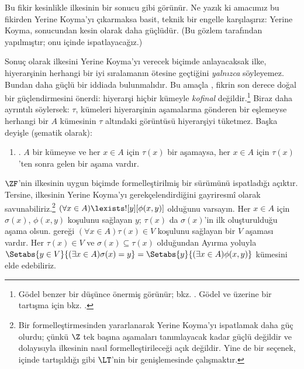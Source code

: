 Bu fikir kesinlikle \stagesinex{} ilkesinin bir sonucu gibi görünür. Ne yazık
ki amacımız bu fikirden Yerine Koyma'yı çıkarmaksa basit, teknik bir engelle
karşılaşırız: Yerine Koyma,
 sonucundan kesin olarak
daha güçlüdür. (Bu gözlem \citet[\S13.2]{Potter2004} tarafından yapılmıştır;
onu  içinde
ispatlayacağız.)

Sonuç olarak \stagesinex{} ilkesini Yerine Koyma'yı verecek biçimde
anlayacaksak ilke, hiyerarşinin herhangi bir iyi sıralamanın ötesine geçtiğini
\emph{yalnızca} söyleyemez. Bundan daha güçlü bir iddiada bulunmalıdır. Bu
amaçla \cite{Shoenfield:AST}, fikrin son derece doğal bir güçlendirmesini
önerdi: hiyerarşi hiçbir kümeyle \emph{kofinal} değildir.\footnote{G\"odel
benzer bir düşünce önermiş görünür; bkz. \citet[p.~223]{Potter2004}. G\"odel
ve \citeauthor{Shoenfield:AST} üzerine bir tartışma için bkz.
\citet[90--5]{Incurvati2020}.} Biraz daha ayrıntılı söylersek: $\tau$, kümeleri
hiyerarşinin aşamalarına gönderen bir eşlemeyse herhangi bir $A$ kümesinin
$\tau$ altındaki görüntüsü hiyerarşiyi tüketmez. Başka deyişle (şematik
olarak):
\begin{enumerate}
	\item[] \stagescofin. $A$ bir kümeyse ve her $x \in A$ için $\tau(x)$
	bir aşamaysa, her $x \in A$ için $\tau(x)$'ten sonra gelen bir aşama vardır.
\end{enumerate}
$\ZF$'nin \stagescofin{} ilkesinin uygun biçimde formelleştirilmiş bir
sürümünü ispatladığı açıktır. Tersine, \stagescofin{} ilkesinin Yerine
Koyma'yı gerekçelendirdiğini gayriresmî olarak savunabiliriz.\footnote{Bir
\stagescofin{} formelleştirmesinden yararlanarak Yerine Koyma'yı ispatlamak
daha güç olurdu; çünkü $\Z$ tek başına aşamaları tanımlayacak kadar güçlü
değildir ve dolayısıyla \stagescofin{} ilkesinin nasıl formelleştirileceği
açık değildir. Yine de bir seçenek,
 içinde tartışıldığı gibi $\LT$'nin
bir genişlemesinde çalışmaktır.} $(\forall x \in A)\lexists![y][\phi(x,y)]$
olduğunu varsayın. Her $x \in A$ için $\sigma(x)$, $\phi(x,y)$ koşulunu
sağlayan $y$; $\tau(x)$ da $\sigma(x)$'in ilk oluşturulduğu aşama olsun.
\stagescofin{} gereği $(\forall x \in A)\tau(x)\in V$ koşulunu sağlayan bir
$V$ aşaması vardır. Her $\tau(x) \in V$ ve $\sigma(x) \subseteq \tau(x)$
olduğundan Ayırma yoluyla
$\Setabs{y \in V}{(\exists x \in A)\sigma(x) = y} =
\Setabs{y}{(\exists x \in A)\phi(x,y)}$ kümesini elde edebiliriz.


